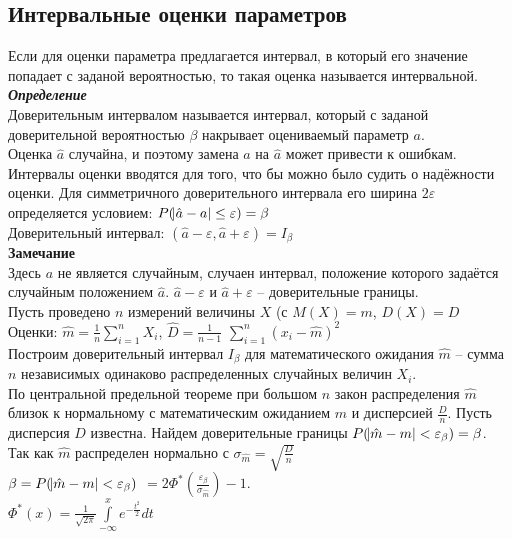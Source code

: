 \documentclass[russian, 12pt, fleqn]{article}
\begin{document}
\subsection{Интервальные оценки параметров}
\noindent
Если для оценки параметра предлагается интервал, в который его значение попадает с заданой вероятностью, то такая оценка называется интервальной.\\
\textit{\textbf{Определение}} \\
Доверительным интервалом называется интервал, который с заданой доверительной вероятностью $\beta$ накрывает оцениваемый параметр $a$.\\
Оценка $\hat{a}$ случайна, и поэтому замена $a$ на $\hat{a}$ может привести к ошибкам. Интервалы оценки вводятся для того, что бы можно было судить о надёжности оценки. Для симметричного доверительного интервала его ширина $2\varepsilon$ определяется условием: $P(\abs{\hat{a} - a} \leq \varepsilon) = \beta$\\
Доверительный интервал: $(\hat{a} - \varepsilon, \hat{a} + \varepsilon) = I_\beta$\\
\textbf{Замечание\ } \\
Здесь $a$ не является случайным, случаен интервал, положение которого задаётся случайным положением $\hat{a}$.
$ \hat{a} - \varepsilon$ и $\hat{a} + \varepsilon$ -- доверительные границы.\\
Пусть проведено  $n$ измерений величины $X$ (с $M(X)=m$, $D(X) = D$\\
 Оценки:  $\hat{m}= \frac{1}{n} \displaystyle{\sum\limits_{i=1} ^ {n}} X_i$, $\hat{D} = \frac{1}{n - 1}$  $\displaystyle{\sum \limits_{i=1} ^ {n}} (x_i - \hat{m})^2$\\
Построим доверительный интервал $I_\beta$ для математического ожидания $\hat{m}$ -- сумма $n$ независимых одинаково распределенных случайных величин $X_i$. \\
По центральной предельной теореме при большом $n$ закон распределения $\hat{m}$ близок к нормальному с математическим ожиданием $m$ и дисперсией $\frac{D}{n}$. Пусть дисперсия $D$ известна. Найдем доверительные границы $P(\abs{\hat{m} - m} < \varepsilon_\beta) = \beta$. 
Так как $\hat{m}$ распределен нормально с $\sigma_{\hat{m}} = \sqrt{\frac{D}{n}}$\\
$\beta = P(\abs{\hat{m} - m} < \varepsilon_\beta)$
$ = 2\Phi^*(\frac{\varepsilon_\beta}{\sigma_{\hat{m}}}) - 1$.\\
$\Phi^*(x) = \frac{1}{\sqrt{2\pi}} \displaystyle{\int \limits _{-\infty} ^ {x}} e^{-\frac{t^2}{2}} dt$\\
\end{document}
